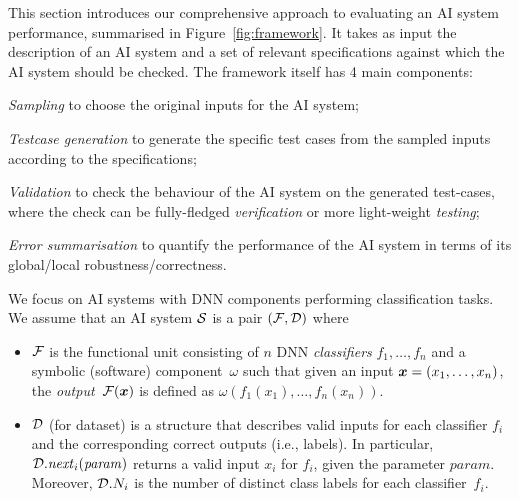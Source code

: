 \documentclass[10pt, conference, a4paper, final]{IEEEtran}
\begin{document}
This section introduces our comprehensive approach to evaluating an AI system performance, summarised in Figure~\ref{fig:framework}. It takes as input the description of an AI system and a set of relevant specifications against which the AI system should be checked. The framework itself has 4 main components: %
\begin{inparaenum}[\it (i)]
\item \emph{Sampling} to choose the original inputs for the AI system;
\item \emph{Testcase generation} to generate the specific test cases from the sampled inputs according to the specifications;
\item \emph{Validation} to check the behaviour of the AI system on the generated test-cases, where the check can be fully-fledged \emph{verification} or more light-weight \emph{testing};
\item \emph{Error summarisation} to quantify the performance of the AI system in terms of its global/local robustness/correctness.
\end{inparaenum}



We focus on AI systems with DNN components performing classification tasks. We assume that an AI system $\S$ is a pair $(\F,\D)$ where
\begin{itemize}[$\bullet$]
\item $\F$ is the functional unit consisting of $n$ DNN \emph{classifiers} $f_1,\dots,f_n$ and a symbolic (software) component~$\omega$ such that given an input $\avec{x}=(x_1,\dots,x_n)$, the \emph{output}~$\F(\avec{x})$ is defined as $\omega(f_1(x_1),\dots,f_n(x_n))$.
\item $\D$ (for dataset) is a structure that describes valid inputs for each classifier $f_i$ and the corresponding correct outputs (i.e., labels). In particular, $\D.\mathit{next}_i(\mathit{param})$ returns a valid input $x_i$ for $f_i$, given the parameter $\mathit{param}$. Moreover, $\D.N_i$ is the number of distinct class labels for each classifier~$f_i$.
\end{itemize}
\end{document}
